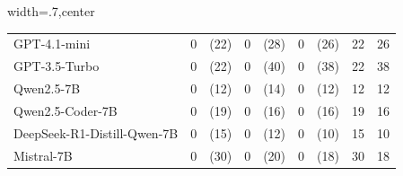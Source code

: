 \begin{table}[tb]
\begin{adjustbox}{width=.7\columnwidth,center}
\begin{tabular}{@{}l cc cc cc cc@{}}
\midrule
GPT-4.1-mini & 0 & (22) & 0 & (28) & 0 & (26) & 22 & 26 \\
GPT-3.5-Turbo & 0 & (22) & 0 & (40) & 0 & (38) & 22 & 38 \\
Qwen2.5-7B & 0 & (12) & 0 & (14) & 0 & (12) & 12 & 12 \\
Qwen2.5-Coder-7B & 0 & (19) & 0 & (16) & 0 & (16) & 19 & 16 \\
DeepSeek-R1-Distill-Qwen-7B & 0 & (15) & 0 & (12) & 0 & (10) & 15 & 10 \\
Mistral-7B & 0 & (30) & 0 & (20) & 0 & (18) & 30 & 18 \\
\bottomrule
\end{tabular}
\end{adjustbox}
\end{table}
